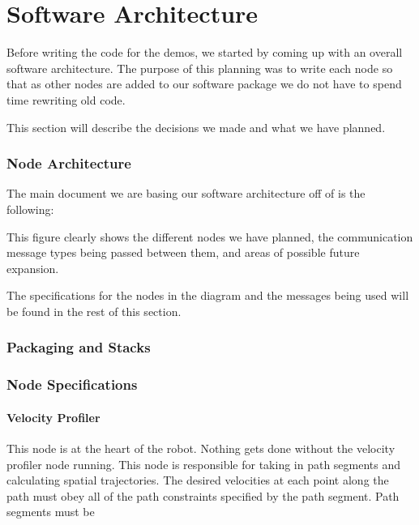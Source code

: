 \part{Software Architecture}

Before writing the code for the demos, we started by coming up with an
overall software architecture.  The purpose of this planning was to
write each node so that as other nodes are added to our software
package we do not have to spend time rewriting old code.

This section will describe the decisions we made and what we have
planned.

\section{Node Architecture}

The main document we are basing our software architecture off of is
the following:


This figure clearly shows the different nodes we have planned, the
communication message types being passed between them, and areas of
possible future expansion.

The specifications for the nodes in the diagram and the messages being
used will be found in the rest of this section.

\section{Packaging and Stacks}

\section{Node Specifications}

\subsection{Velocity Profiler}
This node is at the heart of the robot.  Nothing gets done without the
velocity profiler node running.  This node is responsible for taking
in path segments and calculating spatial trajectories.  The desired
velocities at each point along the path must obey all of the path
constraints specified by the path segment.  Path segments must be

